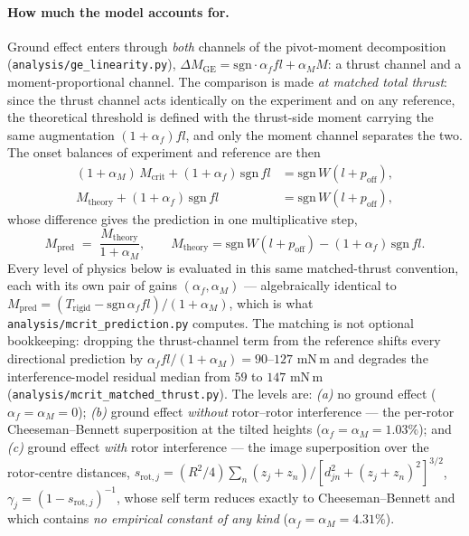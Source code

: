 \documentclass[10pt]{article}
\begin{document}
\paragraph{How much the model accounts for.}
Ground effect enters through \emph{both} channels of the pivot-moment
decomposition (\texttt{analysis/ge\_linearity.py}),
$\Delta M_{\mathrm{GE}} = \mathrm{sgn}\cdot\alpha_f f l +
\alpha_M M$: a thrust channel and a moment-proportional channel. The
comparison is made \emph{at matched total thrust}: since the thrust
channel acts identically on the experiment and on any reference, the
theoretical threshold is defined with the thrust-side moment carrying
the same augmentation $(1+\alpha_f) f l$, and only the moment channel
separates the two. The onset balances of experiment and reference are
then
\begin{equation}
\begin{aligned}
(1+\alpha_M)\,M_{\mathrm{crit}} + (1+\alpha_f)\,\mathrm{sgn}\,f l
  &= \mathrm{sgn}\,W(l + p_{\mathrm{off}}) ,\\
M_{\mathrm{theory}} + (1+\alpha_f)\,\mathrm{sgn}\,f l
  &= \mathrm{sgn}\,W(l + p_{\mathrm{off}}) ,
\end{aligned}
\end{equation}
whose difference gives the prediction in one multiplicative step,
\begin{equation}
M_{\mathrm{pred}} \;=\; \frac{M_{\mathrm{theory}}}{1+\alpha_M},
\qquad
M_{\mathrm{theory}} = \mathrm{sgn}\,W(l + p_{\mathrm{off}}) -
(1+\alpha_f)\,\mathrm{sgn}\,f l .
\end{equation}
Every level of physics below is evaluated in this same
matched-thrust convention, each with its own pair of gains
$(\alpha_f, \alpha_M)$ --- algebraically identical to
$M_{\mathrm{pred}} = (T_{\mathrm{rigid}} - \mathrm{sgn}\,\alpha_f f
l)/(1+\alpha_M)$, which is what
\texttt{analysis/mcrit\_prediction.py} computes. The matching is not
optional bookkeeping: dropping the thrust-channel term from the
reference shifts every directional prediction by
$\alpha_f f l/(1+\alpha_M) = 90$--$127$ mN\,m and degrades the
interference-model residual median from $59$ to $147$ mN\,m
(\texttt{analysis/mcrit\_matched\_thrust.py}).
The levels are: \emph{(a)} no ground effect
($\alpha_f = \alpha_M = 0$);
\emph{(b)} ground effect \emph{without} rotor--rotor interference ---
the per-rotor Cheeseman--Bennett superposition at the tilted heights
($\alpha_f = \alpha_M = 1.03\%$); and \emph{(c)} ground effect
\emph{with} rotor interference --- the image superposition over the
rotor-centre distances,
$s_{\mathrm{rot},j} = (R^2/4)\sum_n (z_j{+}z_n)/[d_{jn}^2 +
(z_j{+}z_n)^2]^{3/2}$, $\gamma_j = (1-s_{\mathrm{rot},j})^{-1}$,
whose self term reduces exactly to Cheeseman--Bennett and which
contains \emph{no empirical constant of any kind}
($\alpha_f = \alpha_M = 4.31\%$).
\end{document}
